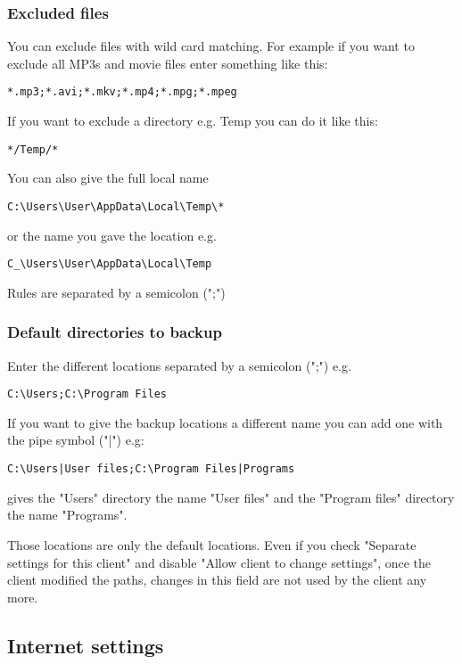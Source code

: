 \documentclass[a4paper,10pt]{article} \usepackage[breaklinks=true]{hyperref}
\begin{document}
\subsubsection{Excluded files}
\label{subsub_excluded_files}

You can exclude files with wild card matching. For example if you want to exclude all MP3s and movie files enter something like this:
\begin{verbatim}
*.mp3;*.avi;*.mkv;*.mp4;*.mpg;*.mpeg
\end{verbatim}
If you want to exclude a directory e.g. Temp you can do it like this:
\begin{verbatim}
*/Temp/*
\end{verbatim}
You can also give the full local name
\begin{verbatim}
C:\Users\User\AppData\Local\Temp\*
\end{verbatim}
or the name you gave the location e.g.
\begin{verbatim}
C_\Users\User\AppData\Local\Temp
\end{verbatim}

Rules are separated by a semicolon (";")

\subsubsection{Default directories to backup}
\label{subsub_default_dirs}

Enter the different locations separated by a semicolon (";") e.g.
\begin{verbatim}
C:\Users;C:\Program Files
\end{verbatim}
If you want to give the backup locations a different name you can add one with the pipe symbol ("|") e.g:
\begin{verbatim}
C:\Users|User files;C:\Program Files|Programs
\end{verbatim}
gives the "Users" directory the name "User files" and the "Program files" directory the name "Programs".

Those locations are only the default locations. Even if you check "Separate settings for this client" and disable "Allow client to change settings", once the client modified the paths, changes in this field are not used by the client any more.

\subsection{Internet settings}
\end{document}
